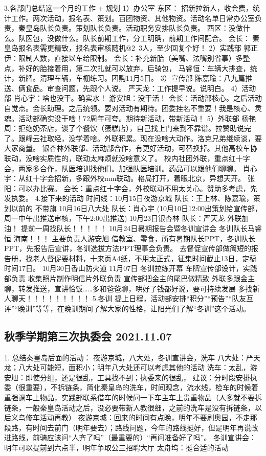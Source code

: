 \documentclass{ctexbook}
\begin{document}
3.各部门总结这一个月的工作 + 规划 1）办公室 东区： 招新拉新人，收会费，统计工作。两次活动，报名表、策划。百团物资、其他物资。活动名单日常办公室负责，秦皇岛队长负责。策划队长负责。活动职务安排队长负责。 西区：没做什么。队医包，没做什么。队长前期工作，分工明确，前期工作间配合。 会长： 秦皇岛报名表需更精致，报名表审核随机@2~3人，至少回复个好！ 2）实践部 郭正伊：限制人数，直接以车给限制。 会长：补充新胎（美嘴、法嘴别省事）多整点，补好的胎接着用，第二次扎就可以放弃，后骑包， 马睿恒：车辆大排查，统计，新牌。清理车辆，车棚练习。团购11月5日。 3）宣传部 陈嘉瑜：八九篇推送、俩食品。审查问题，先跟个人说。 严天龙：工作提早说。说明白。 4）活动部 肖心宇：啥也没干。确实水！  游安旭：没干活！ 会长：活动部核心。之后活动自觉点。会长助理。之后统领。要对活动有期待。团委挂名不重要！我是核心、灵魂。活动部确实没干啥！72周年可夸。期待新活动，带新活动！ 5）外联部 杨艳周：拒绝奶茶店，谈了个餐饮（蛋糕店），自己找上门来到不靠谱。拉赞助说完了。跟峰云社取经，没学着啥。外联积累。现在没啥大动作。洛克兄弟继续谈，要大家商量。 银杏林外联部、活动部合作，有更好活动，可替换掉。其他高校车协联动，没啥实质性的，联动太麻烦就没啥意义了。 校内社团外联，重点红十字会，两家多合作，队医培训找他们。加强队医培训。药品可以跟他们聊聊。 肖心宇：从红十字会招新，多跟外校mm联动。格局打开，着眼北京，异想天开。 张阳：可以办比赛。 会长：重点红十字会，外校联动不用太关心。赞助多考虑，先发执委。 
4.接下来的活动 时间线：10月15日夜游京城  队长：王上林、陈嘉瑜，策划以前的    不带旗         10月16日八大处  队长：肖心宇             (10月10日12:00出策划给宣传部，周一中午出推送审核，下午2:00出推送) 10月23日银杏林 队长：严天龙  外联加油！   提前一周找队长！！！！！ 10月24日暑期报告会暨冬训宣讲会 冬训队长马睿恒  海南！！！     主要负责人游安旭 借教室、零食，所有暑期队长PPT，冬训队长PPT，先报告后宣讲，冬训选拔方法PPT理事会负责。     去督促宣传部做简短的报告册，找老人督促要材料，十来页A4纸，不用太正式，征集时间截止13日，定稿时间17日。 10月30日香山防火道  11月07日 冬训拉练开幕  车牌宣传部设计，实践部负责 收集照片制作明信片外联负责 宣传部把金主的尾巴做精致 外联多跟金主聊，转发推送，宣讲恰饭……多和爸爸聊，哄好了钱都好说，要可持续发展 多找新人聊天！！！！！！！！！  5.冬训 提上日程，活动部安排“积分”“预告”“队友互评”“晚训”等等，在晚训期间了解大家的性格，让阳光们了解“冬训”这个活动。 
\subsection{秋季学期第三次执委会 2021.11.07}
1. 总结秦皇岛后面的活动：
夜游京城，八大处，冬训宣讲会，洗车 八大处：严天龙；八大处可能短，面积小；明年八大处还可以考虑其他的活动 洗车：太乱，游安旭：即使分组，还是很乱，工具找不到；执委来的很乱， 建议：分时段安排执委（很重要），不拆链条，简化秦皇岛的洗车，时间观念，流水线，检车的时候着重强调车上物品，实践部联系借车的时候问一下车主车上贵重物品（人多就不要拆链条，一般秦皇岛活动之后，没必要带新人教很细，之前的洗车是没有拆链条，以后义乌修车活动再教）  夜游京城：回来的时间有点晚，明年不要刷奥园，不走那段路，有时间去前门（明年要去）；路线问题，今年的路线挺好，但是明年再说改进路线，前骑应该问“人齐了吗”（最重要的）“再问准备好了吗”。  冬训宣讲会：明年可以提前到六点半，明年争取公三招聘大厅  太舟坞：挺合适的活动 
\end{document}
